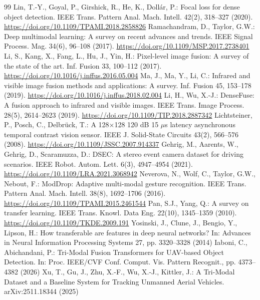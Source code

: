 \begin{thebibliography}{99}
 Lin, T.-Y., Goyal, P., Girshick, R., He, K., Doll\'{a}r, P.: Focal loss for dense object detection. IEEE Trans. Pattern Anal. Mach. Intell. 42(2), 318--327 (2020). \url{https://doi.org/10.1109/TPAMI.2018.2858826}
 Ramachandram, D., Taylor, G.W.: Deep multimodal learning: A survey on recent advances and trends. IEEE Signal Process. Mag. 34(6), 96--108 (2017). \url{https://doi.org/10.1109/MSP.2017.2738401}
 Li, S., Kang, X., Fang, L., Hu, J., Yin, H.: Pixel-level image fusion: A survey of the state of the art. Inf. Fusion 33, 100--112 (2017). \url{https://doi.org/10.1016/j.inffus.2016.05.004}
 Ma, J., Ma, Y., Li, C.: Infrared and visible image fusion methods and applications: A survey. Inf. Fusion 45, 153--178 (2019). \url{https://doi.org/10.1016/j.inffus.2018.02.004}
 Li, H., Wu, X.-J.: DenseFuse: A fusion approach to infrared and visible images. IEEE Trans. Image Process. 28(5), 2614--2623 (2019). \url{https://doi.org/10.1109/TIP.2018.2887342}
 Lichtsteiner, P., Posch, C., Delbr\"uck, T.: A 128$\times$128 120 dB 15 $\mu$s latency asynchronous temporal contrast vision sensor. IEEE J. Solid-State Circuits 43(2), 566--576 (2008). \url{https://doi.org/10.1109/JSSC.2007.914337}
 Gehrig, M., Aarents, W., Gehrig, D., Scaramuzza, D.: DSEC: A stereo event camera dataset for driving scenarios. IEEE Robot. Autom. Lett. 6(3), 4947--4954 (2021). \url{https://doi.org/10.1109/LRA.2021.3068942}
 Neverova, N., Wolf, C., Taylor, G.W., Nebout, F.: ModDrop: Adaptive multi-modal gesture recognition. IEEE Trans. Pattern Anal. Mach. Intell. 38(8), 1692--1706 (2016). \url{https://doi.org/10.1109/TPAMI.2015.2461544}
 Pan, S.J., Yang, Q.: A survey on transfer learning. IEEE Trans. Knowl. Data Eng. 22(10), 1345--1359 (2010). \url{https://doi.org/10.1109/TKDE.2009.191}
 Yosinski, J., Clune, J., Bengio, Y., Lipson, H.: How transferable are features in deep neural networks? In: Advances in Neural Information Processing Systems 27, pp. 3320--3328 (2014)
 Iaboni, C., Abichandani, P.: Tri-Modal Fusion Transformers for UAV-based Object Detection. In: Proc. IEEE/CVF Conf. Comput. Vis. Pattern Recognit., pp. 4373--4382 (2026)
 Xu, T., Gu, J., Zhu, X.-F., Wu, X.-J., Kittler, J.: A Tri-Modal Dataset and a Baseline System for Tracking Unmanned Aerial Vehicles. arXiv:2511.18344 (2025)
\end{thebibliography}

